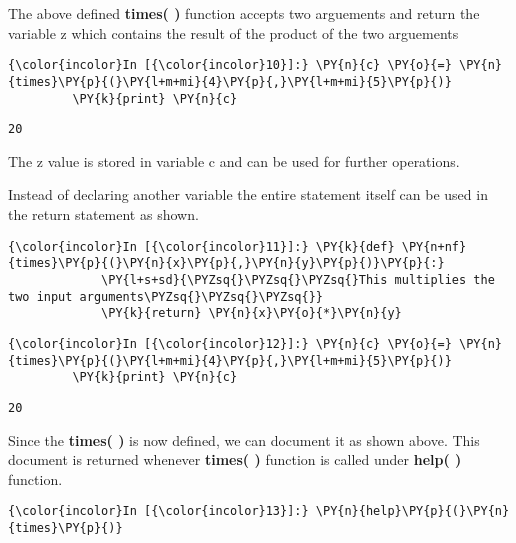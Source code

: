     The above defined \textbf{times( )} function accepts two arguements and
return the variable z which contains the result of the product of the
two arguements

    \begin{Verbatim}[commandchars=\\\{\}]
{\color{incolor}In [{\color{incolor}10}]:} \PY{n}{c} \PY{o}{=} \PY{n}{times}\PY{p}{(}\PY{l+m+mi}{4}\PY{p}{,}\PY{l+m+mi}{5}\PY{p}{)}
         \PY{k}{print} \PY{n}{c}
\end{Verbatim}

    \begin{Verbatim}[commandchars=\\\{\}]
20
    \end{Verbatim}

    The z value is stored in variable c and can be used for further
operations.

    Instead of declaring another variable the entire statement itself can be
used in the return statement as shown.

    \begin{Verbatim}[commandchars=\\\{\}]
{\color{incolor}In [{\color{incolor}11}]:} \PY{k}{def} \PY{n+nf}{times}\PY{p}{(}\PY{n}{x}\PY{p}{,}\PY{n}{y}\PY{p}{)}\PY{p}{:}
             \PY{l+s+sd}{\PYZsq{}\PYZsq{}\PYZsq{}This multiplies the two input arguments\PYZsq{}\PYZsq{}\PYZsq{}}
             \PY{k}{return} \PY{n}{x}\PY{o}{*}\PY{n}{y}
\end{Verbatim}

    \begin{Verbatim}[commandchars=\\\{\}]
{\color{incolor}In [{\color{incolor}12}]:} \PY{n}{c} \PY{o}{=} \PY{n}{times}\PY{p}{(}\PY{l+m+mi}{4}\PY{p}{,}\PY{l+m+mi}{5}\PY{p}{)}
         \PY{k}{print} \PY{n}{c}
\end{Verbatim}

    \begin{Verbatim}[commandchars=\\\{\}]
20
    \end{Verbatim}

    Since the \textbf{times( )} is now defined, we can document it as shown
above. This document is returned whenever \textbf{times( )} function is
called under \textbf{help( )} function.

    \begin{Verbatim}[commandchars=\\\{\}]
{\color{incolor}In [{\color{incolor}13}]:} \PY{n}{help}\PY{p}{(}\PY{n}{times}\PY{p}{)}
\end{Verbatim}

